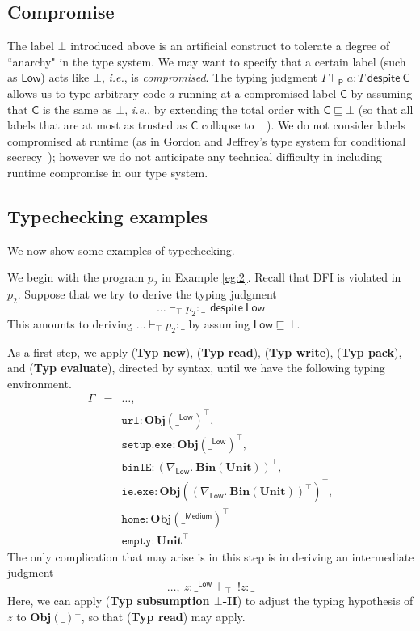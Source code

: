 \documentclass{sigplanconf}
\newcommand{\labp}{\mathsf P}
\newcommand{\labc}{\mathsf C}
\newcommand{\trule}[1]{(\textbf{Typ #1})}
\begin{document}
\subsection{Compromise}
The label $\bot$ introduced above is an artificial construct to tolerate a degree of ``anarchy" in the type system. We may want to specify that a certain label (such as $\mathsf{Low}$) acts like $\bot$, \emph{i.e.}, is \emph{compromised}. The typing judgment $\Gamma \vdash_{\labp} a : T~\mathsf{despite}~\labc$ allows us to type arbitrary code $a$ running at a compromised label $\labc$ by assuming that $\labc$ is the same as $\bot$, \emph{i.e.}, by extending the total order with $\labc \sqsubseteq \bot$ (so that all labels that are at most as trusted as $\labc$ collapse to $\bot$). We do not consider labels compromised at runtime (as in Gordon and
Jeffrey's type system for conditional secrecy~\cite{gordonjeffrey05});
however we do not anticipate any technical difficulty in including runtime compromise in our type
system. 

\subsection{Typechecking examples}
We now show some examples of typechecking. 

We begin with the program $p_2$ in Example \ref{eg:2}. Recall that DFI is violated in $p_2$. Suppose that we try to derive the typing judgment 
$$\dots \vdash_\top p_2 : \_ ~~\mathsf{despite}~\mathsf{Low}$$
This amounts to deriving $\dots \vdash_\top p_2 : \_ $ by assuming $\mathsf{Low} \sqsubseteq \bot$. 

As a first step, we apply \trule{new}, \trule{read}, \trule{write}, \trule{pack}, and \trule{evaluate}, directed by syntax, until we have the following typing environment.
\begin{eqnarray*}
\Gamma & = & \dots,\\
&&\mathtt{url} : \mathbf{Obj}(\_^\mathsf{Low})^\top, \\
&&\mathtt{setup.exe} : \mathbf{Obj}(\_^\mathsf{Low})^\top, \\
&&\mathtt{binIE} : (\nabla_\mathsf{Low}.~\mathbf{Bin}(\mathbf{Unit}))^\top, \\
&&\mathtt{ie.exe} : \mathbf{Obj}((\nabla_\mathsf{Low}.~\mathbf{Bin}(\mathbf{Unit}))^\top)^\top, \\
&& \mathtt{home} : \mathbf{Obj}(\_^\mathsf{Medium})^\top \\
&& \mathtt{empty} : \mathbf{Unit}^\top
\end{eqnarray*}
The only complication that may arise is in this step is in deriving an intermediate judgment
$$\dots,~ z:\_^\mathsf{Low} ~\vdash_\top~!z : \_$$
Here, we can apply \trule{subsumption $\bot$-II} to adjust the typing hypothesis of $z$ to $\mathbf{Obj}(\_)^\bot$, so that \trule{read} may apply.
\end{document}
